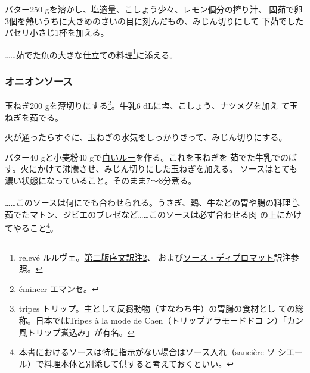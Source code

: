 \begin{recette}
バター250 gを溶かし、塩適量、こしょう少々、レモン\undemi{}個分の搾り汁、
固茹で卵3個を熱いうちに大きめのさいの目に刻んだもの、みじん切りにして
下茹でしたパセリ小さじ1杯を加える。

\ldots{}\ldots{}茹でた魚の大きな仕立ての料理\footnote{relevé
  ルルヴェ。\protect\hyperlink{releve}{第二版序文訳注2}、
  および\protect\hyperlink{sauce-diplomate}{ソース・ディプロマット}訳注参照。}に添える。

\maeaki

\hypertarget{onions-sauce}{%
\subsubsection{オニオンソース}\label{onions-sauce}}



玉ねぎ200 gを薄切りにする\footnote{émincer エマンセ。}。牛乳6
dLに塩、こしょう、ナツメグを加え て玉ねぎを茹でる。

火が通ったらすぐに、玉ねぎの水気をしっかりきって、みじん切りにする。

バター40 gと小麦粉40
gで\protect\hyperlink{roux-blanc}{白いルー}を作る。これを玉ねぎを
茹でた牛乳でのばす。火にかけて沸騰させ、みじん切りにした玉ねぎを加える。
ソースはとても濃い状態になっていること。そのまま7〜8分煮る。

\ldots{}\ldots{}このソースは何にでも合わせられる。うさぎ、鶏、牛などの胃や腸の料理
\footnote{tripes
  トリップ。主として反芻動物（すなわち牛）の胃腸の食材とし
  ての総称。日本ではTripes à la mode de Caen（トリップアラモードドコ
  ン）「カン風トリップ煮込み」が有名。}、茹でたマトン、ジビエのブレゼなど\ldots{}\ldots{}このソースは必ず合わせる肉
の上にかけてやること\footnote{本書におけるソースは特に指示がない場合はソース入れ（saucière
  ソ シエール）で料理本体と別添して供すると考えておくといい。}。


\end{recette}
